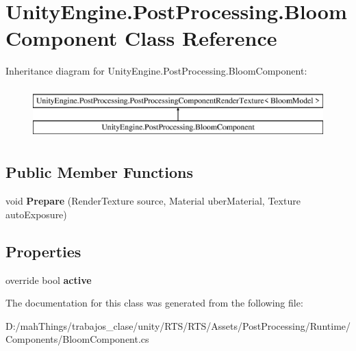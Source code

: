 \hypertarget{class_unity_engine_1_1_post_processing_1_1_bloom_component}{}\section{Unity\+Engine.\+Post\+Processing.\+Bloom\+Component Class Reference}
\label{class_unity_engine_1_1_post_processing_1_1_bloom_component}
Inheritance diagram for Unity\+Engine.\+Post\+Processing.\+Bloom\+Component\+:\begin{figure}[H]
\begin{center}
\leavevmode
\includegraphics[height=2.000000cm]{class_unity_engine_1_1_post_processing_1_1_bloom_component}
\end{center}
\end{figure}
\subsection*{Public Member Functions}
\begin{DoxyCompactItemize}
\item 
\mbox{\label{class_unity_engine_1_1_post_processing_1_1_bloom_component_a36a84fe1a81b038c9e1e0b9e8053c63f}} 
void {\bfseries Prepare} (Render\+Texture source, Material uber\+Material, Texture auto\+Exposure)
\end{DoxyCompactItemize}
\subsection*{Properties}
\begin{DoxyCompactItemize}
\item 
\mbox{\label{class_unity_engine_1_1_post_processing_1_1_bloom_component_a8ad2506285bcf581fc6b39f04650baa7}} 
override bool {\bfseries active}
\end{DoxyCompactItemize}


The documentation for this class was generated from the following file\+:\begin{DoxyCompactItemize}
\item 
D\+:/mah\+Things/trabajos\+\_\+clase/unity/\+R\+T\+S/\+R\+T\+S/\+Assets/\+Post\+Processing/\+Runtime/\+Components/Bloom\+Component.\+cs\end{DoxyCompactItemize}
